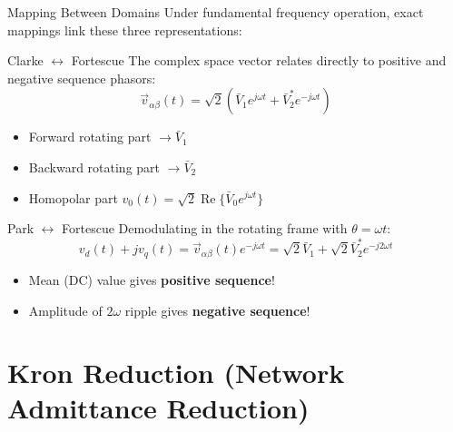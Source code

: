 \begin{frame}[allowframebreaks]{Mapping Between Domains}
    Under fundamental frequency operation, exact mappings link these three representations:

    \begin{block}{Clarke $\longleftrightarrow$ Fortescue}
        The complex space vector relates directly to positive and negative sequence phasors:
        \begin{equation}
            \vec{v}_{\alpha\beta}(t) = \sqrt{2}\left(\bar{V}_1 e^{j\omega t} + \bar{V}_2^* e^{-j\omega t}\right)
        \end{equation}
        \begin{itemize}
            \item Forward rotating part $\to \bar{V}_1$
            \item Backward rotating part $\to \bar{V}_2$
            \item Homopolar part $v_0(t) = \sqrt{2} \operatorname{Re}\{\bar{V}_0 e^{j\omega t}\}$
        \end{itemize}
    \end{block}

    \begin{block}{Park $\longleftrightarrow$ Fortescue}
        Demodulating in the rotating frame with $\theta = \omega t$:
        \begin{equation}
            v_d(t) + j v_q(t) = \vec{v}_{\alpha\beta}(t) e^{-j\omega t} = \sqrt{2} \bar{V}_1 + \sqrt{2} \bar{V}_2^* e^{-j 2\omega t}
        \end{equation}
        \begin{itemize}
            \item Mean (DC) value gives \textbf{positive sequence}!
            \item Amplitude of $2\omega$ ripple gives \textbf{negative sequence}!
        \end{itemize}
    \end{block}
\end{frame}


\section{Kron Reduction (Network Admittance Reduction)}

